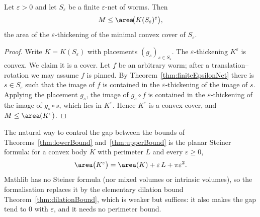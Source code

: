 \begin{theorem}
    \label{thm:upperBound}
    Let $\varepsilon > 0$ and let $S_\varepsilon$ be a finite
    $\varepsilon$-net of worms. Then
    \[
        M \le \area\!\big(K(S_\varepsilon)^{\varepsilon}\big),
    \]
    the area of the $\varepsilon$-thickening of the minimal convex cover of
    $S_\varepsilon$.
\end{theorem}
\begin{proof}
    Write $K = K(S_\varepsilon)$ with placements $(g_s)_{s \in S_\varepsilon}$.
    The $\varepsilon$-thickening $K^{\varepsilon}$ is convex. We claim it is a
    cover. Let $f$ be an arbitrary worm; after a translation--rotation we may
    assume $f$ is pinned. By Theorem~\ref{thm:finiteEpsilonNet} there is
    $s \in S_\varepsilon$ such that the image of $f$ is contained in the
    $\varepsilon$-thickening of the image of $s$. Applying the placement $g_s$,
    the image of $g_s \circ f$ is contained in the $\varepsilon$-thickening of
    the image of $g_s \circ s$, which lies in $K^{\varepsilon}$. Hence
    $K^{\varepsilon}$ is a convex cover, and $M \le \area(K^{\varepsilon})$.
\end{proof}

\begin{remark}
    \label{rem:minkowskiSteinerGap}
    The natural way to control the gap between the bounds of
    Theorems~\ref{thm:lowerBound} and~\ref{thm:upperBound} is the planar Steiner
    formula: for a convex body $K$ with perimeter $L$ and every
    $\varepsilon \ge 0$,
    \[
        \area\big(K^{\varepsilon}\big)
            = \area(K) + \varepsilon\, L + \pi \varepsilon^{2}.
    \]
    Mathlib has no Steiner formula (nor mixed volumes or intrinsic volumes), so
    the formalisation replaces it by the elementary dilation bound
    Theorem~\ref{thm:dilationBound}, which is weaker but suffices: it also makes
    the gap tend to $0$ with $\varepsilon$, and it needs no perimeter bound.
\end{remark}

